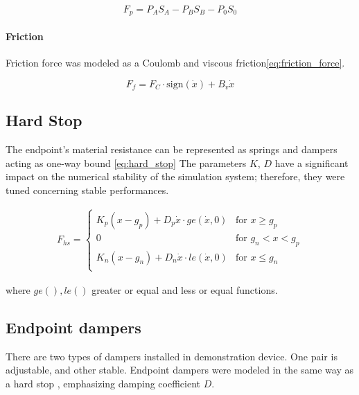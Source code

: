 \begin{equation}
    F_p = P_A S_A - P_B S_B - P_0 S_0
    \label{eq:pneum}
\end{equation}

\paragraph{Friction} Friction force was modeled as a Coulomb and viscous
friction\ref{eq:friction_force}.

\begin{equation}
    F_f = F_C \cdot \text{sign}(\dot{x}) + B_v \dot{x}
    \label{eq:friction_force}
\end{equation}


\subsection{Hard Stop}
The endpoint's material resistance can be represented as springs and
dampers acting as one-way bound \ref{eq:hard_stop}
The parameters $K$, $D$  have a significant impact on the numerical stability
of the simulation system; therefore, they were tuned concerning stable
performances.

\begin{align}
    F_{hs} =
    \begin{cases}
        K_p(x-g_p) + D_p\dot{x} \cdot ge(\dot{x}, 0) & \text{for } x \ge g_p \\
        0 & \text{for } g_n < x < g_p \\
        K_n(x-g_n) + D_n\dot{x} \cdot le(\dot{x}, 0) & \text{for } x \le g_n \\
    \end{cases}
    \label{eq:hard_stop}
\end{align}

where $ge(), le()$ greater or equal and less or equal functions.




\subsection{Endpoint dampers}
There are two types of dampers installed in demonstration device. One pair
is adjustable, and other stable.  Endpoint dampers were modeled in the same
way as a hard stop \label{eq:hard_stop}, emphasizing damping coefficient
$D$. 

